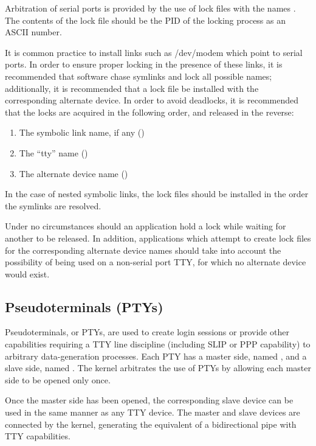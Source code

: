 \documentclass[a4paper,8pt,english]{sphinxmanual}
\begin{document}
Arbitration of serial ports is provided by the use of lock files with
the names . The contents of the lock file should
be the PID of the locking process as an ASCII number.

It is common practice to install links such as /dev/modem
which point to serial ports.  In order to ensure proper locking in the
presence of these links, it is recommended that software chase
symlinks and lock all possible names; additionally, it is recommended
that a lock file be installed with the corresponding alternate
device.  In order to avoid deadlocks, it is recommended that the locks
are acquired in the following order, and released in the reverse:
\begin{enumerate}
\item {} 
The symbolic link name, if any ()

\item {} 
The ``tty'' name ()

\item {} 
The alternate device name ()

\end{enumerate}

In the case of nested symbolic links, the lock files should be
installed in the order the symlinks are resolved.

Under no circumstances should an application hold a lock while waiting
for another to be released.  In addition, applications which attempt
to create lock files for the corresponding alternate device names
should take into account the possibility of being used on a non-serial
port TTY, for which no alternate device would exist.


\subsection{Pseudoterminals (PTYs)}
\label{admin-guide/devices:pseudoterminals-ptys}
Pseudoterminals, or PTYs, are used to create login sessions or provide
other capabilities requiring a TTY line discipline (including SLIP or
PPP capability) to arbitrary data-generation processes.  Each PTY has
a master side, named , and a slave side, named
.  The kernel arbitrates the use of PTYs by
allowing each master side to be opened only once.

Once the master side has been opened, the corresponding slave device
can be used in the same manner as any TTY device.  The master and
slave devices are connected by the kernel, generating the equivalent
of a bidirectional pipe with TTY capabilities.
\end{document}
